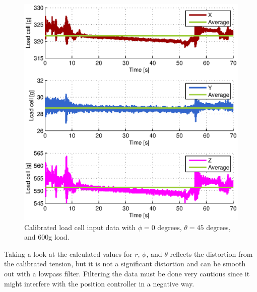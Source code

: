 \begin{figure}[hbtp]
\centering
\includegraphics[scale=1]{graphics/fcs_test/calib_result_compare.eps}
\caption[Calibrated data with $\phi=0$ degrees, $\theta=45$ degrees, and 600g load.]{Calibrated load cell input data with $\phi=0$ degrees, $\theta=45$ degrees, and 600g load.}
\label{fig:FCS-calib-results}
\end{figure}

\newpage
\noindent
Taking a look at the calculated values for $r$, $\phi$, and $\theta$ reflects the distortion from the calibrated tension, but it is not a significant distortion and can be smooth out with a lowpass filter. Filtering the data must be done very cautious since it might interfere with the position controller in a negative way.  

